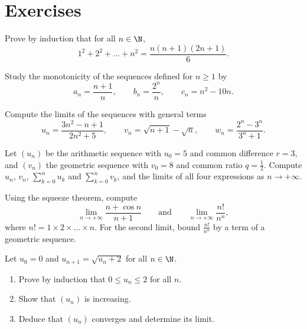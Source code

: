 \section{Exercises}

\begin{exercise}[$\star$]\label{exo:tle:seq:1}
Prove by induction that for all $n \in \N$,
\[
1^2 + 2^2 + \dots + n^2 = \frac{n(n+1)(2n+1)}{6}.
\]
\end{exercise}

\begin{exercise}[$\star$]\label{exo:tle:seq:2}
Study the monotonicity of the sequences defined for $n \geq 1$ by
\[
a_n = \frac{n+1}{n}, \qquad
b_n = \frac{2^n}{n}, \qquad
c_n = n^2 - 10n .
\]
\end{exercise}

\begin{exercise}[$\star$]\label{exo:tle:seq:3}
Compute the limits of the sequences with general terms
\[
u_n = \frac{3n^2 - n + 1}{2n^2 + 5}, \qquad
v_n = \sqrt{n+1} - \sqrt{n}, \qquad
w_n = \frac{2^n - 3^n}{3^n + 1}.
\]
\end{exercise}

\begin{exercise}[$\star$]\label{exo:tle:seq:4}
Let $(u_n)$ be the arithmetic sequence with $u_0 = 5$ and common difference
$r = 3$, and $(v_n)$ the geometric sequence with $v_0 = 8$ and common ratio
$q = \frac{1}{2}$. Compute $u_n$, $v_n$, $\sum_{k=0}^{n} u_k$ and
$\sum_{k=0}^{n} v_k$, and the limits of all four expressions as
$n \to +\infty$.
\end{exercise}

\begin{exercise}[$\star\star$]\label{exo:tle:seq:5}
Using the squeeze theorem, compute
\[
\lim_{n\to+\infty} \frac{n + \cos n}{n + 1}
\qquad\text{and}\qquad
\lim_{n\to+\infty} \frac{n!}{n^n},
\]
where $n! = 1 \times 2 \times \dots \times n$. For the second limit, bound
$\frac{n!}{n^n}$ by a term of a geometric sequence.
\end{exercise}

\begin{exercise}[$\star\star$]\label{exo:tle:seq:6}
Let $u_0 = 0$ and $u_{n+1} = \sqrt{u_n + 2}$ for all $n \in \N$.
\begin{enumerate}
  \item Prove by induction that $0 \leq u_n \leq 2$ for all $n$.
  \item Show that $(u_n)$ is increasing.
  \item Deduce that $(u_n)$ converges and determine its limit.
\end{enumerate}
\end{exercise}

